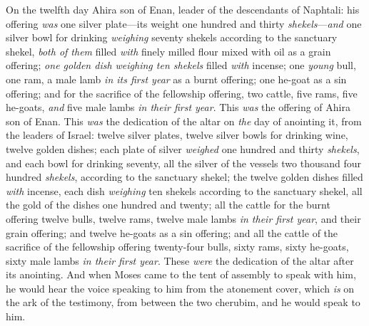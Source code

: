 \begin{biblechapter}
\verse On the twelfth day Ahira son of Enan, leader of the descendants of Naphtali:
\verse his offering \textit{was} one silver plate—its weight one hundred and thirty \textit{shekels}—\textit{and} one silver bowl for drinking \textit{weighing} seventy shekels according to the sanctuary shekel, \textit{both of them} filled \textit{with} finely milled flour mixed with oil as a grain offering;
\verse \textit{one golden dish weighing ten shekels} filled \textit{with} incense;
\verse one \textit{young} bull, one ram, a male lamb \textit{in its first year} as a burnt offering;
\verse one he-goat as a sin offering;
\verse and for the sacrifice of the fellowship offering, two cattle, five rams, five he-goats, \textit{and} five male lambs \textit{in their first year}. This \textit{was} the offering of Ahira son of Enan.
\verse This \textit{was} the dedication of the altar on \textit{the} day of anointing it, from the leaders of Israel: twelve silver plates, twelve silver bowls for drinking wine, twelve golden dishes;
\verse each plate of silver \textit{weighed} one hundred and thirty \textit{shekels}, and each bowl for drinking seventy, all the silver of the vessels two thousand four hundred \textit{shekels}, according to the sanctuary shekel;
\verse the twelve golden dishes filled \textit{with} incense, each dish \textit{weighing} ten shekels according to the sanctuary shekel, all the gold of the dishes one hundred and twenty;
\verse all the cattle for the burnt offering twelve bulls, twelve rams, twelve male lambs \textit{in their first year}, and their grain offering; and twelve he-goats as a sin offering;
\verse and all the cattle of the sacrifice of the fellowship offering twenty-four bulls, sixty rams, sixty he-goats, sixty male lambs \textit{in their first year}. These \textit{were} the dedication of the altar after its anointing.
\verse And when Moses came to the tent of assembly to speak with him, he would hear the voice speaking to him from the atonement cover, which \textit{is} on the ark of the testimony, from between the two cherubim, and he would speak to him.
\end{biblechapter}

